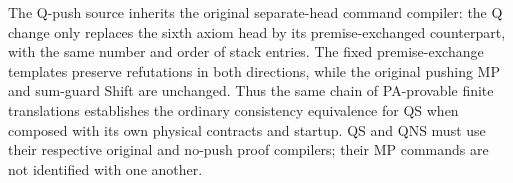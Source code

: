 The Q-push source inherits the original separate-head command compiler:
the Q change only replaces the sixth axiom head by its premise-exchanged
counterpart, with the same number and order of stack entries.  The fixed
premise-exchange templates preserve refutations in both directions, while
the original pushing MP and sum-guard Shift are unchanged.  Thus the
same chain of PA-provable finite translations establishes the ordinary
consistency equivalence for QS when composed with its own physical
contracts and startup.  QS and QNS must use their respective original
and no-push proof compilers; their MP commands are not identified with
one another.
